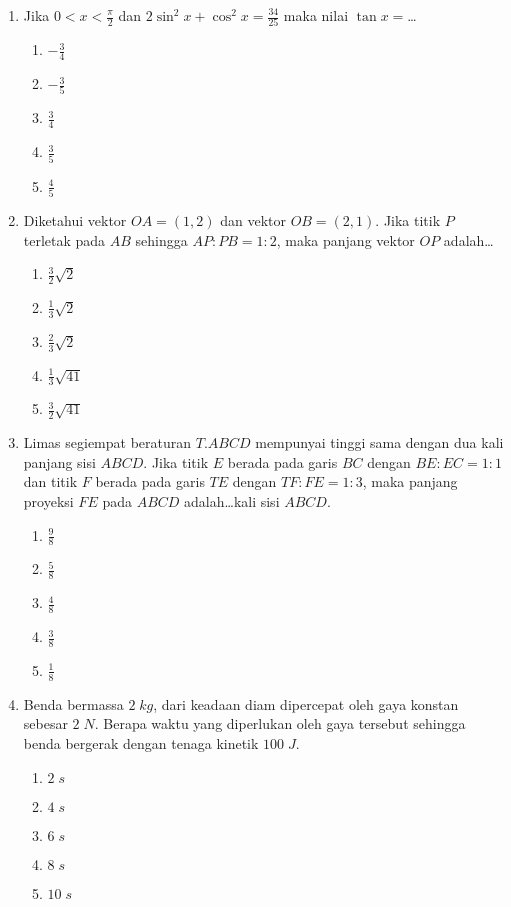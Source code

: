 \documentclass[A4,12PT, english, twocolumn]{journal}
\begin{document}
\begin{enumerate}
\item Jika $0 < x < \frac{\pi}{2}$ dan $2 \sin^2{x} + \cos^2{x} = \frac{34}{25}$ maka nilai $\tan{x}=$\dots
    \begin{enumerate}
        \item $-\frac{3}{4}$
        \item $-\frac{3}{5}$
        \item $\frac{3}{4}$
        \item $\frac{3}{5}$
        \item $\frac{4}{5}$
    \end{enumerate}

\item Diketahui vektor $OA=(1,2)$ dan vektor $OB=(2,1)$. Jika titik $P$ terletak pada $AB$ sehingga $AP : PB = 1 : 2$, maka panjang vektor $OP$ adalah\dots
    \begin{enumerate}
        \item $\frac{3}{2} \sqrt{2}$
        \item $\frac{1}{3} \sqrt{2}$
        \item $\frac{2}{3} \sqrt{2}$
        \item $\frac{1}{3} \sqrt{41}$
        \item $\frac{3}{2} \sqrt{41}$
    \end{enumerate}

\item Limas segiempat beraturan $T.ABCD$ mempunyai tinggi sama dengan dua kali panjang sisi $ABCD$. Jika titik $E$ berada pada garis $BC$ dengan $BE : EC = 1 : 1$ dan titik $F$ berada pada garis $TE$ dengan $TF : FE = 1 : 3$, maka panjang proyeksi $FE$ pada $ABCD$ adalah\dots kali sisi $ABCD$.
    \begin{enumerate}
        \item $\frac{9}{8}$
        \item $\frac{5}{8}$
        \item $\frac{4}{8}$
        \item $\frac{3}{8}$
        \item $\frac{1}{8}$
    \end{enumerate}
    

\newpage
\item Benda bermassa $2 \; kg$, dari keadaan diam dipercepat oleh gaya konstan sebesar $2 \; N$. Berapa waktu yang diperlukan oleh gaya tersebut sehingga benda bergerak dengan tenaga kinetik $100 \; J$.
    \begin{enumerate}
        \item $2 \; s$
        \item $4 \; s$
        \item $6 \; s$
        \item $8 \; s$
        \item $10 \; s$
    \end{enumerate}
  

\end{enumerate}
\end{document}
